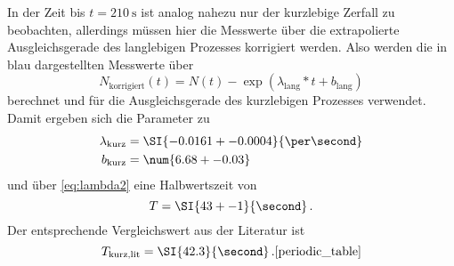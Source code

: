 In der Zeit bis $t=\SI{210}{\second}$ ist analog nahezu nur der kurzlebige Zerfall zu beobachten, allerdings müssen hier die Messwerte über die extrapolierte Ausgleichsgerade des langlebigen Prozesses korrigiert werden.
Also werden die in blau dargestellten Messwerte über
\begin{equation}
    N_\text{korrigiert}(t) = N(t) - \exp(\lambda_\text{lang} * t + b_\text{lang})
\end{equation}
berechnet und für die Ausgleichsgerade des kurzlebigen Prozesses verwendet.
Damit ergeben sich die Parameter zu
\begin{align*}
    \lambda_\text{kurz} &= \SI{-0.0161+-0.0004}{\per\second} \\
    b_\text{kurz} &= \num{6.68+-0.03}
\end{align*}
und über \autoref{eq:lambda2} eine Halbwertszeit von 
\begin{equation*}
    T = \SI{43+-1}{\second} \, .
\end{equation*}
Der entsprechende Vergleichswert aus der Literatur ist 
\begin{equation*}
    T_\text{kurz,lit} = \SI{42.3}{\second} \, .\text{\cite{periodic_table}}
\end{equation*}

